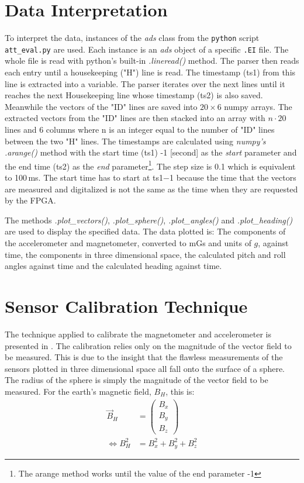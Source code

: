 \section{Data Interpretation \label{sec:meth:data_interpretation}}
To interpret the data, instances of the \textit{ads} class from the \verb|python| script \verb|att_eval.py| are used. Each instance is an \textit{ads} object of a specific \verb|.EI| file. The whole file is read with python's built-in \textit{.lineread()} method. The parser then reads each entry until a housekeeping ("H") line is read. The timestamp (ts1) from this line is extracted into a variable. The parser iterates over the next lines until it reaches the next Housekeeping line whose timestamp (ts2) is also saved. Meanwhile the vectors of the "ID" lines are saved into $20\times6$ numpy arrays. The extracted vectors from the "ID" lines are then stacked into an array with $n\cdot20$ lines and 6 columns where n is an integer equal to the number of "ID" lines between the two "H" lines. The timestamps are calculated using \textit{numpy's .arange()} method with the start time (ts1) -1 [second] as the \textit{start} parameter and the end time (ts2) as the \textit{end} parameter\footnote{The arange method works until the value of the end parameter -1}. The step size is 0.1 which is equivalent to 100\,ms. The start time has to start at ts1$-$1 because the time that the vectors are measured and digitalized is not the same as the time when they are requested by the \ac{FPGA}.

The methods \textit{.plot\_vectors()}, \textit{.plot\_sphere()}, \textit{.plot\_angles()} and \textit{.plot\_heading()} are used to display the specified data. The data plotted is: The components of the accelerometer and magnetometer, converted to mGs and units of $g$, against time, the components in three dimensional space, the calculated pitch and roll angles against time and the calculated heading against time.

\section{Sensor Calibration Technique \label{sec:meth:calibration_technique}}
The technique applied to calibrate the magnetometer and accelerometer is presented in \cite{non-orthonogality}. The calibration relies only on the magnitude of the vector field to be measured. This is due to the insight that the flawless measurements of the sensors plotted in three dimensional space all fall onto the surface of a sphere. The radius of the sphere is simply the magnitude of the vector field to be measured. For the earth's magnetic field, $B_H$, this is:
\begin{align}
    \vec{B}_H&=\begin{pmatrix} B_x \\ B_y \\ B_z \end{pmatrix} \label{eq:earth_field} \\
    \iff B_H^2& = B_x^2+B_y^2+B_z^2 
    \label{eq:regular_sphere}
\end{align}

